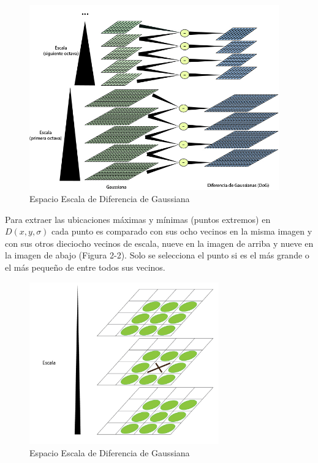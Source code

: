\begin{figure}[H]
	\centering
	\includegraphics[height=8cm]{img/spaceScale.jpg}
	\caption{Espacio Escala de Diferencia de Gaussiana}
\end{figure}	
Para extraer las ubicaciones máximas y mínimas (puntos extremos) en $D(x,y,\sigma)$ cada punto es comparado con sus ocho vecinos en la misma imagen y con sus otros dieciocho vecinos de escala, nueve en la imagen de arriba y nueve en la imagen de abajo (Figura 2-2). Solo se selecciona el punto si es el más grande o el más pequeño de entre todos sus vecinos.
\begin{figure}[H]
	\centering
		\includegraphics[height=7cm]{img/EscalaPuntosExtremos.jpg}
	\caption{Espacio Escala de Diferencia de Gaussiana}
\end{figure}
